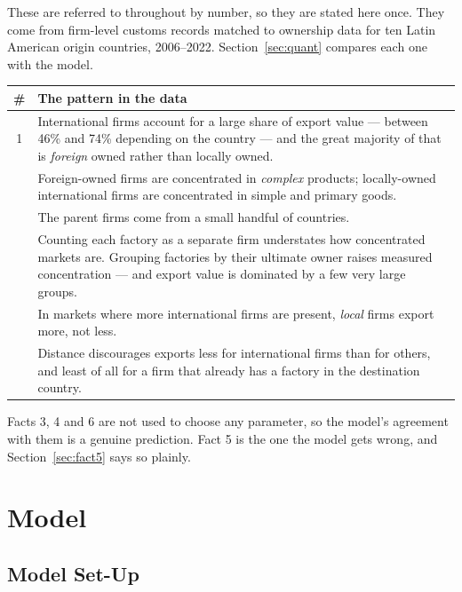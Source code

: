 \documentclass[11pt]{article}
\theoremstyle{plain}
\theoremstyle{remark}
\theoremstyle{definition}
\begin{document}
These are referred to throughout by number, so they are stated here once. They come
from firm-level customs records matched to ownership data for ten Latin American
origin countries, 2006--2022. Section~\ref{sec:quant} compares each one with the model.

\begin{center}
\begin{tabular}{cp{11.6cm}}
\toprule
\# & The pattern in the data\\
\midrule
1 & International firms account for a large share of export value --- between 46\% and
74\% depending on the country --- and the great majority of that is \emph{foreign}
owned rather than locally owned.\\
\addlinespace
2 & Foreign-owned firms are concentrated in \emph{complex} products; locally-owned
international firms are concentrated in simple and primary goods.\\
\addlinespace
3 & The parent firms come from a small handful of countries.\\
\addlinespace
4 & Counting each factory as a separate firm understates how concentrated markets are.
Grouping factories by their ultimate owner raises measured concentration --- and export
value is dominated by a few very large groups.\\
\addlinespace
5 & In markets where more international firms are present, \emph{local} firms export
more, not less.\\
\addlinespace
6 & Distance discourages exports less for international firms than for others, and
least of all for a firm that already has a factory in the destination country.\\
\bottomrule
\end{tabular}
\end{center}

\noindent Facts 3, 4 and 6 are not used to choose any parameter, so the model's
agreement with them is a genuine prediction. Fact 5 is the one the model gets wrong,
and Section~\ref{sec:fact5} says so plainly.

\newpage
\section{Model}
\label{sec:model}

\subsection{Model Set-Up}
\end{document}
